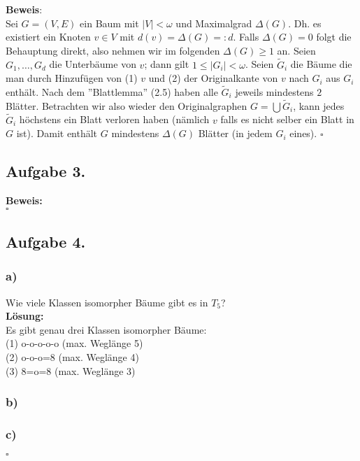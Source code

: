 \documentclass[11pt,a4paper,ngerman]{article}
\begin{document}
\textbf{Beweis}:\\
Sei $G=(V,E)$ ein Baum mit $|V| < \omega$ und Maximalgrad $\Delta(G)$.
Dh. es existiert ein Knoten $v \in V$ mit $d(v) = \Delta(G) =: d$. 
Falls $\Delta(G) = 0$
folgt die Behauptung direkt, also nehmen wir im folgenden $\Delta(G) \geq 1$ an.
Seien $G_1,\ldots,G_d$ die Unterbäume von $v$; dann gilt $1\leq |G_i| < \omega$. 
Seien $\tilde{G}_i$ die Bäume die man durch Hinzufügen von
(1) $v$ und (2) der Originalkante von $v$ nach $G_i$ aus $G_i$ enthält.
Nach dem ''Blattlemma'' (2.5) haben alle $\tilde{G}_i$ jeweils mindestens $2$ Blätter.
Betrachten wir also wieder den Originalgraphen $G = \bigcup \tilde{G}_i$, kann jedes
$\tilde{G}_i$ höchstens ein Blatt verloren haben (nämlich $v$ falls es nicht selber ein Blatt in $G$ ist). 
Damit enthält $G$ mindestens $\Delta(G)$ Blätter (in jedem $G_i$ eines).
\mbox{}\hfill$\square$

\subsection*{Aufgabe 3.}
\textbf{Beweis:}\\
\mbox{}\hfill$\square$

\subsection*{Aufgabe 4.}
\subsubsection*{a)}
Wie viele Klassen isomorpher Bäume gibt es in $T_5$? \\
\textbf{Lösung:}\\
Es gibt genau drei Klassen isomorpher Bäume:\\
(1) o-o-o-o-o (max. Weglänge 5)\\
(2) o-o-o=8 (max. Weglänge 4)\\
(3) 8=o=8 (max. Weglänge 3)
\subsubsection*{b)}
\subsubsection*{c)}
\mbox{}\hfill$\square$

\label{LastPage}
\end{document}
